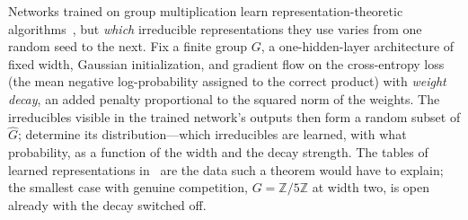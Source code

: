 \begin{openproblem}
Networks trained on group multiplication learn representation-theoretic algorithms~\cite{nanda2023,chughtai2023}, but \emph{which} irreducible representations they use varies from one random seed to the next. Fix a finite group $G$, a one-hidden-layer architecture of fixed width, Gaussian initialization, and gradient flow on the cross-entropy loss (the mean negative log-probability assigned to the correct product) with \emph{weight decay}, an added penalty proportional to the squared norm of the weights. The irreducibles visible in the trained network's outputs then form a random subset of $\widehat{G}$; determine its distribution---which irreducibles are learned, with what probability, as a function of the width and the decay strength. The tables of learned representations in~\cite{chughtai2023} are the data such a theorem would have to explain; the smallest case with genuine competition, $G=\mathbb{Z}/5\mathbb{Z}$ at width two, is open already with the decay switched off.
\end{openproblem}

